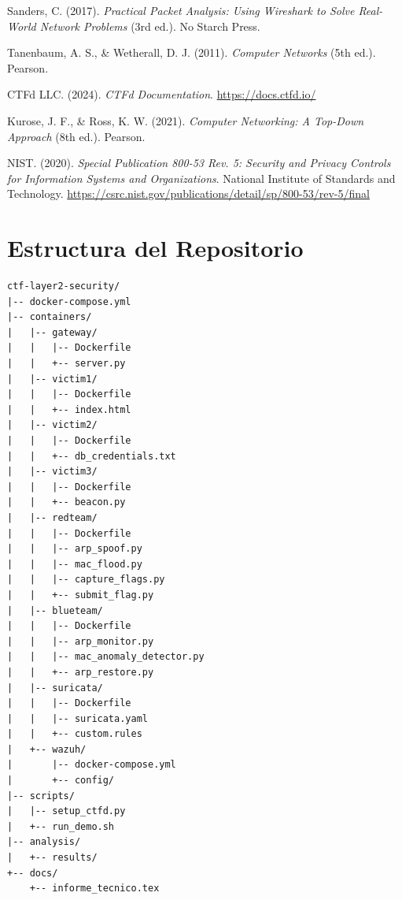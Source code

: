 \documentclass[12pt, a4paper]{article}
\begin{document}
\begin{enumerate}[leftmargin=2cm, label={[\arabic*]}]
    \item Sanders, C. (2017). \textit{Practical Packet Analysis: Using Wireshark to Solve Real-World Network Problems} (3rd ed.). No Starch Press.

    \item Tanenbaum, A. S., \& Wetherall, D. J. (2011). \textit{Computer Networks} (5th ed.). Pearson.

    \item CTFd LLC. (2024). \textit{CTFd Documentation}. \url{https://docs.ctfd.io/}

    \item Kurose, J. F., \& Ross, K. W. (2021). \textit{Computer Networking: A Top-Down Approach} (8th ed.). Pearson.

    \item NIST. (2020). \textit{Special Publication 800-53 Rev. 5: Security and Privacy Controls for Information Systems and Organizations}. National Institute of Standards and Technology. \url{https://csrc.nist.gov/publications/detail/sp/800-53/rev-5/final}
\end{enumerate}

\newpage

\appendix

\section{Estructura del Repositorio}
\label{app:repo-structure}

\begin{lstlisting}[style=bashstyle, caption={Estructura de directorios del proyecto}]
ctf-layer2-security/
|-- docker-compose.yml
|-- containers/
|   |-- gateway/
|   |   |-- Dockerfile
|   |   +-- server.py
|   |-- victim1/
|   |   |-- Dockerfile
|   |   +-- index.html
|   |-- victim2/
|   |   |-- Dockerfile
|   |   +-- db_credentials.txt
|   |-- victim3/
|   |   |-- Dockerfile
|   |   +-- beacon.py
|   |-- redteam/
|   |   |-- Dockerfile
|   |   |-- arp_spoof.py
|   |   |-- mac_flood.py
|   |   |-- capture_flags.py
|   |   +-- submit_flag.py
|   |-- blueteam/
|   |   |-- Dockerfile
|   |   |-- arp_monitor.py
|   |   |-- mac_anomaly_detector.py
|   |   +-- arp_restore.py
|   |-- suricata/
|   |   |-- Dockerfile
|   |   |-- suricata.yaml
|   |   +-- custom.rules
|   +-- wazuh/
|       |-- docker-compose.yml
|       +-- config/
|-- scripts/
|   |-- setup_ctfd.py
|   +-- run_demo.sh
|-- analysis/
|   +-- results/
+-- docs/
    +-- informe_tecnico.tex
\end{lstlisting}
\end{document}
